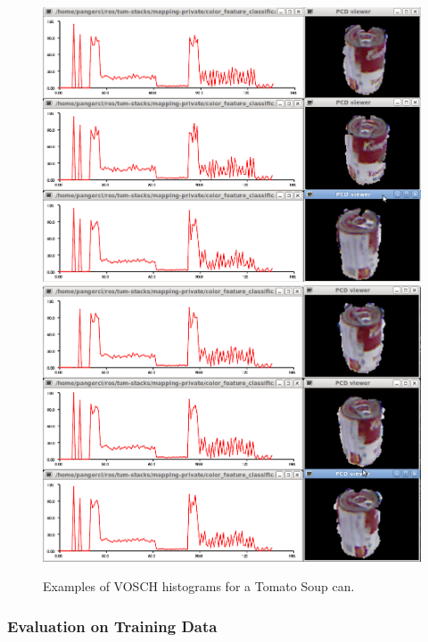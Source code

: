 \documentclass[conference]{sty/IEEEtran}
\begin{document}
\begin{figure}[htb!]
  \begin{center}
    \includegraphics[width=.9\columnwidth]{figures/colorCHLAC/real/tomato/tomato_hist_pcd.png}
    \includegraphics[width=.9\columnwidth]{figures/colorCHLAC/real/tomato/tomato_hist_pcd2.png}
    \caption{Examples of  VOSCH histograms for a Tomato Soup can.}
    \label{fig:grsd_colorchlac_tomato}
  \end{center}
\end{figure}


\subsubsection{Evaluation on Training Data}

\end{document}

